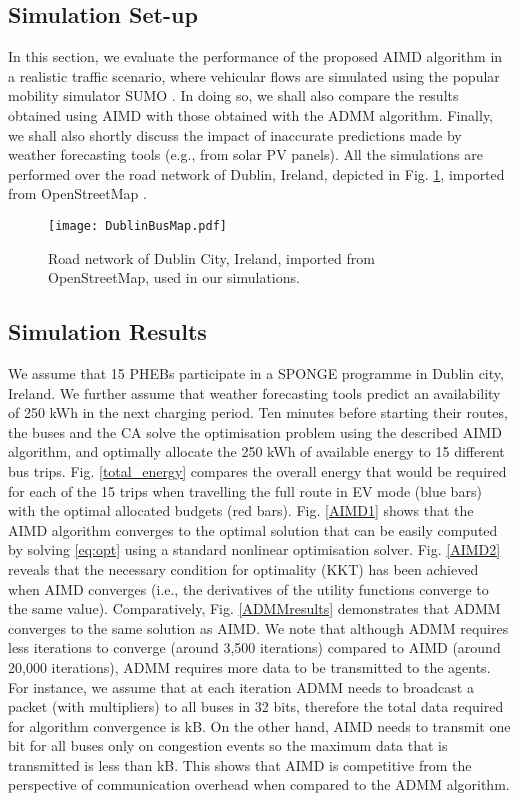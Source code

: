 \documentclass[journal]{IEEEtran}
\begin{document}
\subsection{Simulation Set-up}

In this section, we evaluate the performance of the proposed AIMD algorithm in a realistic traffic scenario, where vehicular flows are simulated using the popular mobility simulator SUMO \cite{SUMORef}. In doing so, we shall also compare the results obtained using AIMD with those obtained with the ADMM algorithm. Finally, we shall also shortly discuss the impact of inaccurate predictions made by weather forecasting tools (e.g., from solar PV panels). All the simulations are performed over the road network of Dublin, Ireland, depicted in Fig. \ref{DublinMap}, imported from OpenStreetMap \cite{openstreetmap}. 
\begin{figure}[htbp]
	\begin{center}
		{\texttt{[image: DublinBusMap.pdf]}}
		\caption{Road network of Dublin City, Ireland, imported from OpenStreetMap, used in our simulations.}
		\label{DublinMap}
	\end{center}
\end{figure}



\subsection{Simulation Results}

We assume that 15 PHEBs participate in a SPONGE programme in Dublin city, Ireland. We further assume that weather forecasting tools predict an availability of 250 kWh in the next charging period. Ten minutes before starting their routes, the buses and the CA solve the optimisation problem using the described AIMD algorithm, and optimally allocate the 250 kWh of available energy to 15 different bus trips. Fig. \ref{total_energy} compares the overall energy that would be required for each of the 15 trips when travelling the full route in EV mode (blue bars) with the optimal allocated budgets (red bars). Fig. \ref{AIMD1} shows that the AIMD algorithm converges to the optimal solution that can be easily computed by solving \eqref{eq:opt} using a standard nonlinear optimisation solver. Fig. \ref{AIMD2} reveals that the necessary condition for optimality (KKT) has been achieved when AIMD converges (i.e., the derivatives of the utility functions converge to the same value). Comparatively, Fig. \ref{ADMMresults} demonstrates that ADMM converges to the same solution as AIMD. We note that although ADMM requires less iterations to converge (around 3,500 iterations) compared to AIMD (around 20,000 iterations), ADMM requires more data to be transmitted to the agents. For instance, we assume that at each iteration ADMM needs to broadcast a packet (with multipliers) to all buses in 32 bits, therefore the total data required for algorithm convergence is kB. On the other hand, AIMD needs to transmit one bit for all buses only on congestion events so the maximum data that is transmitted is less than kB. This shows that AIMD is competitive from the perspective of communication overhead when compared to the ADMM algorithm.   
\end{document}
